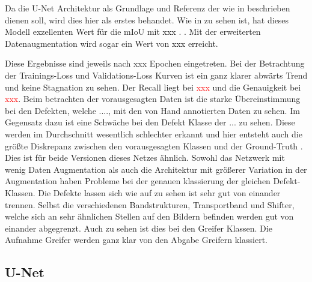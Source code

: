 Da die U-Net \cite{Ronneberger.18.05.2015} Architektur als Grundlage und Referenz der wie in  beschrieben dienen soll, wird dies hier als erstes behandet. 
Wie in  zu sehen ist, hat dieses Modell exzellenten Wert für die mIoU mit xxx 
. 
. Mit der erweiterten Datenaugmentation wird sogar ein Wert von xxx erreicht.

Diese Ergebnisse sind jeweils nach xxx Epochen eingetreten. Bei der Betrachtung der Trainings-Loss und Validations-Loss Kurven ist ein ganz klarer abwärts Trend und keine Stagnation zu sehen. Der Recall liegt bei \textcolor{red}{xxx} und die Genauigkeit bei \textcolor{red}{xxx}. 
Beim betrachten der vorausgesagten Daten ist die starke Übereinstimmung bei den Defekten, welche ...., mit den von Hand annotierten Daten zu sehen. Im Gegensatz dazu ist eine Schwäche bei den Defekt Klasse der ... zu sehen. Diese werden im Durchschnitt wesentlich schlechter erkannt und hier entsteht auch die größte Diskrepanz zwischen den vorausgesagten Klassen und der Ground-Truth . Dies ist für beide Versionen dieses Netzes ähnlich. Sowohl das Netzwerk mit wenig Daten Augmentation als auch die Architektur mit größerer Variation in der Augmentation haben Probleme bei der genauen klassierung der gleichen Defekt-Klassen. 
Die Defekte lassen sich wie auf  zu sehen ist sehr gut von einander trennen. Selbst die verschiedenen Bandstrukturen, Transportband und Shifter, welche sich an sehr ähnlichen Stellen auf den Bildern befinden werden gut von einander abgegrenzt. 
Auch zu sehen ist dies bei den Greifer Klassen. Die Aufnahme Greifer werden ganz klar von den Abgabe Greifern klassiert.




\subsection{U-Net}

